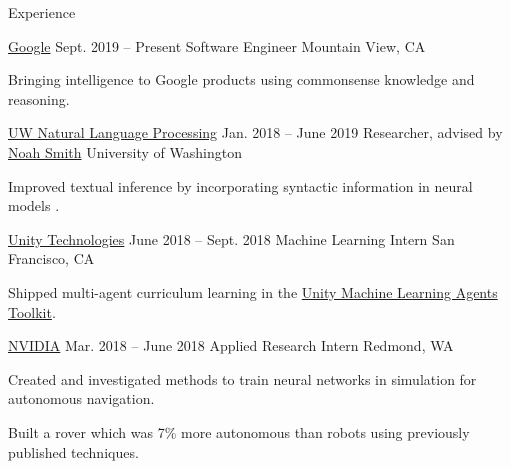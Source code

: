 \documentclass{resume}
\begin{document}
\begin{rSection}{Experience}
  \begin{rSubsection}{\href{https://www.google.com/}
                           {Google}}
                     {Sept. 2019 -- Present}
                     {Software Engineer}
                     {Mountain View, CA}
    \item Bringing intelligence to Google products using commonsense knowledge and reasoning.
  \end{rSubsection}

  \begin{rSubsection}{\href{https://nlp.washington.edu/}
                           {UW Natural Language Processing}}
                     {Jan. 2018 -- June 2019}
                     {Researcher, advised by
                       \href{https://homes.cs.washington.edu/~nasmith/}
                            {Noah Smith}}
                     {University of Washington}
    \item Improved textual inference by incorporating syntactic
      information in neural models \citep{pang2019improving}.
  \end{rSubsection}

  \begin{rSubsection}{{\href{https://unity3d.ai/}{Unity Technologies}}}
                      {June 2018 -- Sept. 2018}
                      {Machine Learning Intern}
                      {San Francisco, CA}
    \item Shipped multi-agent curriculum learning in the
      \href{https://github.com/Unity-Technologies/ml-agents}
           {Unity Machine Learning Agents Toolkit}.
  \end{rSubsection}

  \begin{rSubsection}{{\href{http://www.nvidia.com/page/home.html}{NVIDIA}}}
                      {Mar. 2018 -- June 2018}
                      {Applied Research Intern}
                      {Redmond, WA}
    \item Created and investigated methods to train neural networks in
      simulation for autonomous navigation.
    \item Built a rover which was 7\% more autonomous than robots using
      previously published techniques.
  \end{rSubsection}


\end{rSection}
\end{document}
